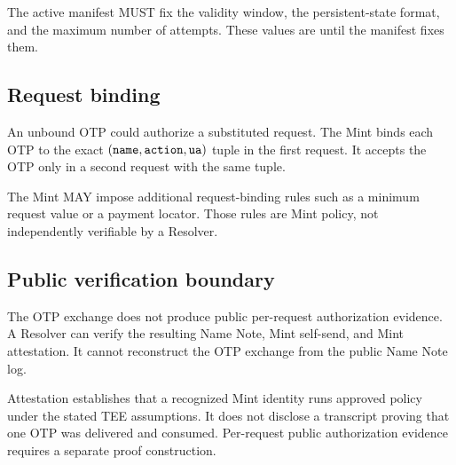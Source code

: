 The active manifest MUST fix the validity window, the persistent-state format, and the maximum number of attempts.
These values are \openstatus{} until the manifest fixes them.

\subsection{Request binding}

An unbound OTP could authorize a substituted request.
The Mint binds each OTP to the exact \((\texttt{name}, \texttt{action}, \texttt{ua})\) tuple in the first request.
It accepts the OTP only in a second request with the same tuple.

The Mint MAY impose additional request-binding rules such as a minimum request value or a payment locator.
Those rules are Mint policy, not independently verifiable by a Resolver.

\subsection{Public verification boundary}

The OTP exchange does not produce public per-request authorization evidence.
A Resolver can verify the resulting Name Note, Mint self-send, and Mint attestation.
It cannot reconstruct the OTP exchange from the public Name Note log.

Attestation establishes that a recognized Mint identity runs approved policy under the stated TEE assumptions.
It does not disclose a transcript proving that one OTP was delivered and consumed.
Per-request public authorization evidence requires a separate proof construction.


